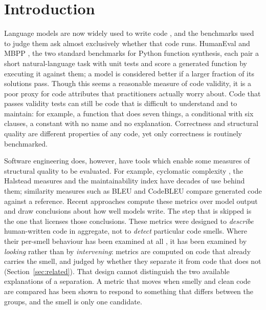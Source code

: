 \documentclass[10pt,a4paper,twocolumn]{article}
\begin{document}
\section{Introduction}
\label{sec:intro}

Language models are now widely used to write code
\cite{stackoverflow2025}, and the benchmarks used to judge them ask almost
exclusively whether that code runs. HumanEval \cite{humaneval2021} and MBPP \cite{mbpp2021}, the two standard
benchmarks for Python function synthesis, each pair a short natural-language
task with unit tests and score a generated function by executing it against
them; a model is considered better if a larger fraction of its solutions pass. Though this seems a reasonable measure of code validity, it is a poor proxy for
code attributes that practitioners actually worry about. Code that passes
validity tests can still be code that is difficult to understand and to
maintain: for example, a function that does seven things, a conditional with six
clauses, a constant with no name and no explanation. Correctness and structural
quality are different properties of any code, yet only correctness is routinely
benchmarked.

Software engineering does, however, have tools which enable some measures of
structural quality to be evaluated. For example, cyclomatic complexity
\cite{mccabe1976complexity}, the Halstead measures \cite{halstead1977elements}
and the maintainability index \cite{coleman1994maintainability} have decades of
use behind them; similarity measures such as BLEU \cite{papineni2002bleu} and
CodeBLEU \cite{codebleu2020} compare generated code against a reference. Recent approaches compute these metrics over model output
and draw conclusions about how well models write. The step that is skipped is the one that licenses those
conclusions. These metrics were designed to \emph{describe} human-written code
in aggregate, not to \emph{detect} particular code smells. Where their per-smell
behaviour has been examined at all \cite{fontana2016comparing,dinucci2018detecting,azeem2019machine}, it has been
examined by \emph{looking} rather than by \emph{intervening}: metrics are
computed on code that already carries the smell, and judged by whether they
separate it from code that does not (Section~\ref{sec:related}). That design cannot distinguish the two
available explanations of a separation. A metric that moves when smelly and
clean code are compared has been shown to respond to something that differs between the groups, and the smell is only one candidate.
\end{document}
